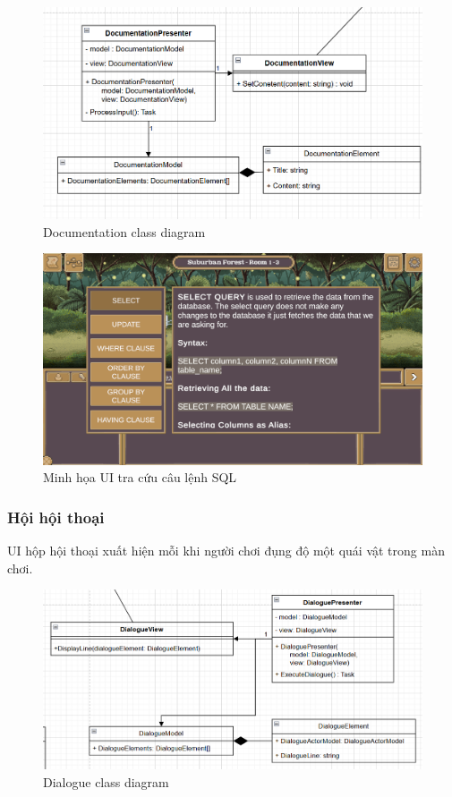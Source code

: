 \begin{figure}[H]
	\centering
	\includegraphics[width=13cm]{Images/DocumentationView.png}
	\vspace{0.5cm}
	\caption{Documentation class diagram}
\end{figure}

\begin{figure}[H]
	\centering
	\includegraphics[width=13cm]{Images/DocumentationUI.png}
	\vspace{0.5cm}
	\caption{Minh họa UI tra cứu câu lệnh SQL}
\end{figure}

\subsubsection{Hội hội thoại}

UI hộp hội thoại xuất hiện mỗi khi người chơi đụng độ một quái vật trong màn chơi.

\begin{figure}[H]
	\centering
	\includegraphics[width=13cm]{Images/DialogueView.png}
	\vspace{0.5cm}
	\caption{Dialogue class diagram}
\end{figure}

